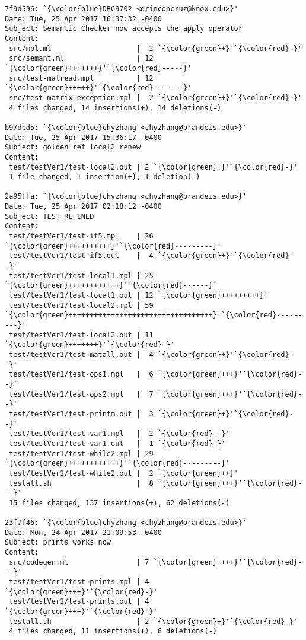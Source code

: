 \begin{lstlisting}
7f9d596: `{\color{blue}DRC9702 <drinconcruz@knox.edu>}'
Date: Tue, 25 Apr 2017 16:37:32 -0400
Subject: Semantic Checker now accepts the apply operator
Content: 
 src/mpl.ml                    |  2 `{\color{green}+}'`{\color{red}-}'
 src/semant.ml                 | 12 `{\color{green}+++++++}'`{\color{red}-----}'
 src/test-matread.mpl          | 12 `{\color{green}+++++}'`{\color{red}-------}'
 src/test-matrix-exception.mpl |  2 `{\color{green}+}'`{\color{red}-}'
 4 files changed, 14 insertions(+), 14 deletions(-)

b97dbd5: `{\color{blue}chyzhang <chyzhang@brandeis.edu>}'
Date: Tue, 25 Apr 2017 15:36:17 -0400
Subject: golden ref local2 renew
Content: 
 test/testVer1/test-local2.out | 2 `{\color{green}+}'`{\color{red}-}'
 1 file changed, 1 insertion(+), 1 deletion(-)

2a95ffa: `{\color{blue}chyzhang <chyzhang@brandeis.edu>}'
Date: Tue, 25 Apr 2017 02:18:12 -0400
Subject: TEST REFINED
Content: 
 test/testVer1/test-if5.mpl    | 26 `{\color{green}++++++++++}'`{\color{red}---------}'
 test/testVer1/test-if5.out    |  4 `{\color{green}+}'`{\color{red}--}'
 test/testVer1/test-local1.mpl | 25 `{\color{green}++++++++++++}'`{\color{red}------}'
 test/testVer1/test-local1.out | 12 `{\color{green}+++++++++}'
 test/testVer1/test-local2.mpl | 59 `{\color{green}++++++++++++++++++++++++++++++++++}'`{\color{red}---------}'
 test/testVer1/test-local2.out | 11 `{\color{green}+++++++}'`{\color{red}-}'
 test/testVer1/test-matall.out |  4 `{\color{green}+}'`{\color{red}--}'
 test/testVer1/test-ops1.mpl   |  6 `{\color{green}+++}'`{\color{red}--}'
 test/testVer1/test-ops2.mpl   |  7 `{\color{green}+++}'`{\color{red}--}'
 test/testVer1/test-printm.out |  3 `{\color{green}+}'`{\color{red}--}'
 test/testVer1/test-var1.mpl   |  2 `{\color{red}--}'
 test/testVer1/test-var1.out   |  1 `{\color{red}-}'
 test/testVer1/test-while2.mpl | 29 `{\color{green}++++++++++++}'`{\color{red}---------}'
 test/testVer1/test-while2.out |  2 `{\color{green}++}'
 testall.sh                    |  8 `{\color{green}+++}'`{\color{red}---}'
 15 files changed, 137 insertions(+), 62 deletions(-)

23f7f46: `{\color{blue}chyzhang <chyzhang@brandeis.edu>}'
Date: Mon, 24 Apr 2017 21:09:53 -0400
Subject: prints works now
Content: 
 src/codegen.ml                | 7 `{\color{green}++++}'`{\color{red}---}'
 test/testVer1/test-prints.mpl | 4 `{\color{green}+++}'`{\color{red}-}'
 test/testVer1/test-prints.out | 4 `{\color{green}+++}'`{\color{red}-}'
 testall.sh                    | 2 `{\color{green}+}'`{\color{red}-}'
 4 files changed, 11 insertions(+), 6 deletions(-)


\end{lstlisting}
